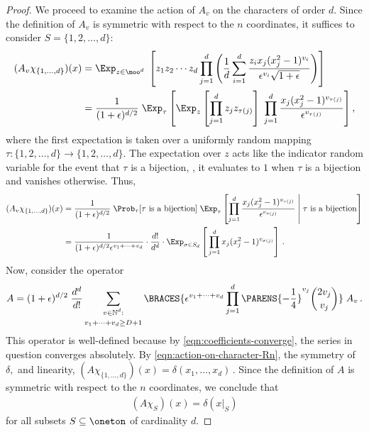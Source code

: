 \begin{proof}
We proceed to examine the action of $A_v$ on the
characters of order $d$. Since the definition of $A_v$
is symmetric with respect to the $n$ coordinates, it
suffices to consider
$S=\{1,2,\dots,d\}$:
\begin{align*}
(A_v\chi_{\{1,\dots,d\}})(x)
 &=
\Exp_{z\in\moo^d} \;
\left[z_1z_2\cdots z_d \prod_{j=1}^d\left(
\frac1d\sum_{i=1}^d
\frac{z_ix_j(x_j^2-1)^{v_i}}
{\epsilon^{v_i}
\sqrt{1+\epsilon}
}
\right)
\right]
\\
&=
\frac1{(1+\epsilon)^{d/2}}\;
 \Exp_{\tau} 
\left[\Exp_{z}\left[\prod_{j=1}^d z_j
z_{\tau(j)}\right]\;\prod_{j=1}^d
\frac{x_j(x_j^2-1)^{v_{\tau(j)}}}
     {\epsilon^{v_{\tau(j)}}} 
\right],
\end{align*}
where the first expectation is taken over a uniformly
random mapping $\tau\colon \{1,2,\dots,d\}\to\{1,2,\dots,d\}$. 
The expectation over $z$ acts like the
indicator random variable for the event that $\tau$ is a bijection,
\ie, it evaluates to $1$ when $\tau$ is a bijection and
vanishes otherwise.  Thus,
\begin{align}
(A_v\chi_{\{1,\dots,d\}})(x)
&=
\frac1{(1+\epsilon)^{d/2}}\;
\Prob_\tau[\text{$\tau$ is a bijection}] \;
\Exp_{\tau} 
\left[\prod_{j=1}^d
\frac{x_j(x_j^2-1)^{v_{\tau(j)}}}
     {\epsilon^{v_{\tau(j)}}} \;
\middle| \; \text{$\tau$ is a bijection}\right]\nonumber\\
&=
\frac1{(1+\epsilon)^{d/2}\epsilon^{v_1+\cdots+v_d}}
\cdot \frac{d!}{d^d}\cdot
\Exp_{\sigma\in S_d} 
\left[\,\prod_{j=1}^d x_j(x_j^2-1)^{v_{\sigma(j)}}\right]\,.
\label{eqn:action-on-character-Rn}
\end{align}
Now, consider the operator
\begin{align*}
A= 
(1+\epsilon)^{d/2}\;\frac{d^d}{d!}\sum_{\substack{\rule{0mm}{2mm}v\in\mathbb
N^d:\\\rule{0mm}{3mm}v_1+\cdots+v_d\geq D+1}} 
 \BRACES{\epsilon^{v_1+\cdots+v_d}
\prod_{j=1}^d\PARENS{-\frac14}^{v_j}{2v_j \choose v_j}}
  \; A_v\,.
\end{align*}
This operator is well-defined because by 
\eqref{eqn:coefficients-converge},
the series in question converges absolutely.
By \eqref{eqn:action-on-character-Rn}, the symmetry
of $\delta,$ and linearity,
$
(A\chi_{\{1,\dots,d\}})(x)=\delta(x_1,\dots,x_d)\,.
$
Since the definition of $A$ is symmetric with respect to
the $n$ coordinates, we conclude that
\begin{align*}
(A\chi_S)(x) = \delta(x|_S)
\end{align*}
for all subsets $S\subseteq\oneton$ of cardinality $d$.

\end{proof}
